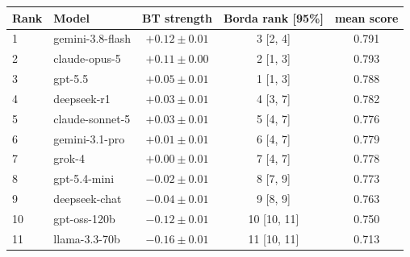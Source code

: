 \begin{tabular}{llccc}
\toprule
Rank & Model & BT strength & Borda rank [95\%] & mean score \\
\midrule
1 & gemini-3.8-flash & $+0.12 \pm 0.01$ & 3 [2, 4] & 0.791 \\
2 & claude-opus-5 & $+0.11 \pm 0.00$ & 2 [1, 3] & 0.793 \\
3 & gpt-5.5 & $+0.05 \pm 0.01$ & 1 [1, 3] & 0.788 \\
4 & deepseek-r1 & $+0.03 \pm 0.01$ & 4 [3, 7] & 0.782 \\
5 & claude-sonnet-5 & $+0.03 \pm 0.01$ & 5 [4, 7] & 0.776 \\
6 & gemini-3.1-pro & $+0.01 \pm 0.01$ & 6 [4, 7] & 0.779 \\
7 & grok-4 & $+0.00 \pm 0.01$ & 7 [4, 7] & 0.778 \\
8 & gpt-5.4-mini & $-0.02 \pm 0.01$ & 8 [7, 9] & 0.773 \\
9 & deepseek-chat & $-0.04 \pm 0.01$ & 9 [8, 9] & 0.763 \\
10 & gpt-oss-120b & $-0.12 \pm 0.01$ & 10 [10, 11] & 0.750 \\
11 & llama-3.3-70b & $-0.16 \pm 0.01$ & 11 [10, 11] & 0.713 \\
\bottomrule
\end{tabular}
